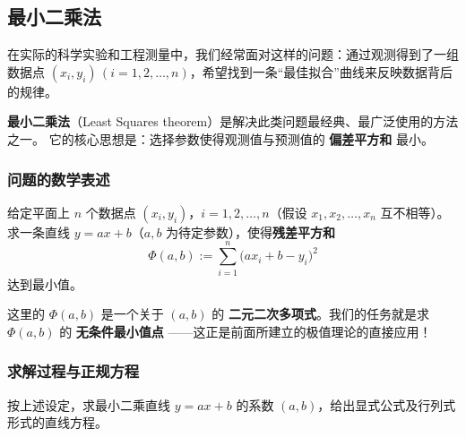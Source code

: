 \documentclass[lang=cn,11pt]{elegantbook}
\begin{document}
\subsection{最小二乘法}

在实际的科学实验和工程测量中，我们经常面对这样的问题：通过观测得到了一组数据点 $(x_i,y_i)\,(i=1,2,\dots,n)$，希望找到一条“最佳拟合”曲线来反映数据背后的规律。

\textbf{最小二乘法}（Least Squares theorem）是解决此类问题最经典、最广泛使用的方法之一。
它的核心思想是：选择参数使得观测值与预测值的 \textbf{偏差平方和} 最小。

\subsubsection*{问题的数学表述}

\begin{definition}[线性最小二乘拟合] \label{theorem:least-squares-linear}
给定平面上 $n$ 个数据点 $(x_i,y_i)$，$i=1,2,\dots,n$（假设 $x_1,x_2,\dots,x_n$ 互不相等）。
求一条直线 $y=ax+b$（$a,b$ 为待定参数），使得\textbf{残差平方和}
\[
\Phi(a,b):=\sum_{i=1}^{n}\bigl(ax_i+b-y_i\bigr)^2
\]
达到最小值。
\end{definition}

这里的 $\Phi(a,b)$ 是一个关于 $(a,b)$ 的 \textbf{二元二次多项式}。我们的任务就是求 $\Phi(a,b)$ 的 \textbf{无条件最小值点} ——这正是前面所建立的极值理论的直接应用！

\subsubsection*{求解过程与正规方程}

\begin{example} \label{ex:least-squares-determinant}
按上述设定，求最小二乘直线 $y=ax+b$ 的系数 $(a,b)$，给出显式公式及行列式形式的直线方程。
\end{example}
\end{document}
